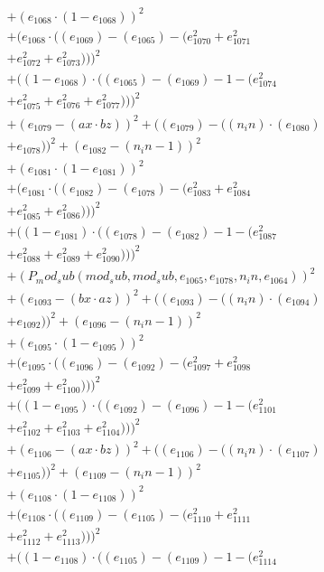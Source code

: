 \documentclass[10pt, a4paper]{article}
\begin{document}
\begin{align*}
& + (e_{1068}  \cdot  (1 - e_{1068}))^{2} \\
& + (e_{1068}  \cdot  ((e_{1069}) - (e_{1065}) - (e_{1070}^{2} + e_{1071}^{2} \\
& + e_{1072}^{2} + e_{1073}^{2})))^{2} \\
& + ((1 - e_{1068})  \cdot  ((e_{1065}) - (e_{1069}) - 1 - (e_{1074}^{2} \\
& + e_{1075}^{2} + e_{1076}^{2} + e_{1077}^{2})))^{2} \\
& + (e_{1079} - (ax  \cdot  bz))^{2} + ((e_{1079}) - ((n_in)  \cdot  (e_{1080}) \\
& + e_{1078}))^{2} + (e_{1082} - (n_in - 1))^{2} \\
& + (e_{1081}  \cdot  (1 - e_{1081}))^{2} \\
& + (e_{1081}  \cdot  ((e_{1082}) - (e_{1078}) - (e_{1083}^{2} + e_{1084}^{2} \\
& + e_{1085}^{2} + e_{1086}^{2})))^{2} \\
& + ((1 - e_{1081})  \cdot  ((e_{1078}) - (e_{1082}) - 1 - (e_{1087}^{2} \\
& + e_{1088}^{2} + e_{1089}^{2} + e_{1090}^{2})))^{2} \\
& + (P_mod_sub(mod_sub, mod_sub, e_{1065}, e_{1078}, n_in, e_{1064}))^{2} \\
& + (e_{1093} - (bx  \cdot  az))^{2} + ((e_{1093}) - ((n_in)  \cdot  (e_{1094}) \\
& + e_{1092}))^{2} + (e_{1096} - (n_in - 1))^{2} \\
& + (e_{1095}  \cdot  (1 - e_{1095}))^{2} \\
& + (e_{1095}  \cdot  ((e_{1096}) - (e_{1092}) - (e_{1097}^{2} + e_{1098}^{2} \\
& + e_{1099}^{2} + e_{1100}^{2})))^{2} \\
& + ((1 - e_{1095})  \cdot  ((e_{1092}) - (e_{1096}) - 1 - (e_{1101}^{2} \\
& + e_{1102}^{2} + e_{1103}^{2} + e_{1104}^{2})))^{2} \\
& + (e_{1106} - (ax  \cdot  bz))^{2} + ((e_{1106}) - ((n_in)  \cdot  (e_{1107}) \\
& + e_{1105}))^{2} + (e_{1109} - (n_in - 1))^{2} \\
& + (e_{1108}  \cdot  (1 - e_{1108}))^{2} \\
& + (e_{1108}  \cdot  ((e_{1109}) - (e_{1105}) - (e_{1110}^{2} + e_{1111}^{2} \\
& + e_{1112}^{2} + e_{1113}^{2})))^{2} \\
& + ((1 - e_{1108})  \cdot  ((e_{1105}) - (e_{1109}) - 1 - (e_{1114}^{2} \\

\end{align*}
\end{document}
